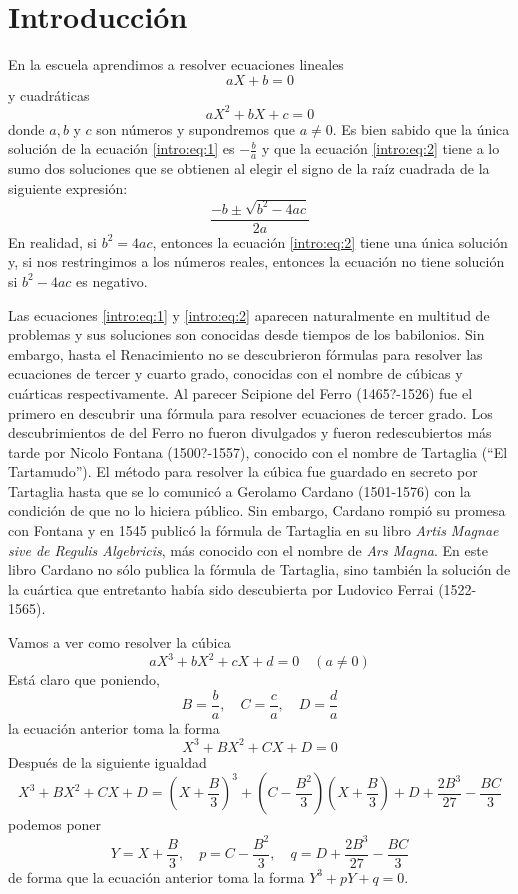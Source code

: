 \chapter{Introducción}

En la escuela aprendimos a resolver ecuaciones lineales
\begin{equation}\label{intro:eq:1}
    aX + b = 0
\end{equation}
y cuadráticas
\begin{equation}\label{intro:eq:2}
    aX^2 + bX + c = 0
\end{equation}
donde $a,b$ y $c$ son números y supondremos que $a\neq 0$. Es bien sabido que la única solución de la ecuación \ref{intro:eq:1} es $-\frac{b}{a}$ y que la ecuación \ref{intro:eq:2} tiene a lo sumo dos soluciones que se obtienen al elegir el signo de la raíz cuadrada de la siguiente expresión:
\begin{equation}\label{intro:eq:3}
    \frac{-b\pm \sqrt{b^2-4ac}}{2a}    
\end{equation}
En realidad, si $b^2=4ac$, entonces la ecuación \ref{intro:eq:2} tiene una única solución y, si nos restringimos a los números reales, entonces la ecuación no tiene solución si $b^2-4ac$ es negativo.

Las ecuaciones \ref{intro:eq:1} y \ref{intro:eq:2} aparecen naturalmente en multitud de problemas y sus soluciones son conocidas desde tiempos de los babilonios. Sin embargo, hasta el Renacimiento no se descubrieron fórmulas para resolver las ecuaciones de tercer y cuarto grado, conocidas con el nombre de cúbicas y cuárticas respectivamente. Al parecer Scipione del Ferro (1465?-1526) fue el primero en descubrir una fórmula para resolver ecuaciones de tercer grado. Los descubrimientos de del Ferro no fueron divulgados y fueron redescubiertos más tarde por Nicolo Fontana (1500?-1557), conocido con el nombre de Tartaglia (``El Tartamudo''). El método para resolver la cúbica fue guardado en secreto por Tartaglia hasta que se lo comunicó a Gerolamo Cardano (1501-1576) con la condición de que no lo hiciera público. Sin embargo, Cardano rompió su promesa con Fontana y en 1545 publicó la fórmula de Tartaglia en su libro {\it Artis Magnae sive de Regulis Algebricis}, más conocido con el nombre de {\it Ars Magna}. En este libro Cardano no sólo publica la fórmula de Tartaglia, sino también la solución de la cuártica que entretanto había sido descubierta por Ludovico Ferrai (1522-1565).

Vamos a ver como resolver la cúbica
\begin{equation}
    aX^3+bX^2+cX+d=0\quad (a\neq 0)
\end{equation}
Está claro que poniendo,
$$B=\frac{b}{a}, \quad C=\frac{c}{a}, \quad D=\frac{d}{a}$$
la ecuación anterior toma la forma
\begin{equation}
    X^3+BX^2+CX+D=0
\end{equation}
Después de la siguiente igualdad
$$X^3+BX^2+CX+D=\left(X+\frac{B}{3}\right)^3+\left(C-\frac{B^2}{3}\right)\left(X+\frac{B}{3}\right)+D+\frac{2B^3}{27}-\frac{BC}{3}$$
podemos poner
$$Y=X+\frac{B}{3}, \quad p=C-\frac{B^2}{3}, \quad q=D+\frac{2B^3}{27}-\frac{BC}{3}$$
de forma que la ecuación anterior toma la forma $Y^3+pY+q=0$.

